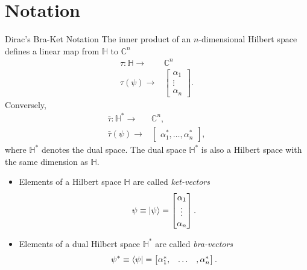 \section{Notation}
\begin{definition}{Dirac's Bra-Ket Notation}{}
The inner product of an $n$-dimensional Hilbert space defines a linear map from $\mathbb{H}$ to $\mathbb{C}^{n}$
\begin{align*}
  \tau: \mathbb{H}\longrightarrow& \mathbb{C}^{n} \\
  \tau(\psi) \longrightarrow& \begin{bmatrix}
           \alpha_{1} \\
           \vdots \\
           \alpha_{n}
         \end{bmatrix}.
\end{align*}  
Conversely, 
\begin{align*}
  \bar{\tau}: \mathbb{H}^{*}\longrightarrow& \mathbb{C}^{n}, \\
  \bar{\tau}(\psi)\longrightarrow& 
         \begin{bmatrix}
           \alpha_{1}^{*}, \hdots, \alpha_{n}^{*}
         \end{bmatrix},
\end{align*} 
where $\mathbb{H}^{*}$ denotes the dual space. The dual space $\mathbb{H}^{*}$ is also a Hilbert space with the same dimension as $\mathbb{H}$. 
\begin{itemize}
    \item Elements of a Hilbert space $\mathbb{H}$ are called \textit{ket-vectors} 
\begin{equation}
    \psi \equiv \ket{\psi} =  \begin{bmatrix}
           \alpha_{1} \\
           \vdots \\
           \alpha_{n}
         \end{bmatrix}.
\end{equation}
\item Elements of a dual Hilbert space $\mathbb{H}^{*}$ are called \textit{bra-vectors}
\begin{equation}
    \psi^{*} \equiv \bra{\psi} =  \begin{bmatrix}
           \alpha_{1}^{*}, & \hdots &, \alpha_{n}^{*}
         \end{bmatrix}.
\end{equation}
\end{itemize}
\end{definition}
